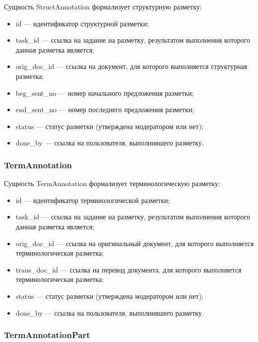 Сущность StructAnnotation формализует структурную разметку:
\begin{itemize}
    \item id --- идентификатор структурной разметки;
    \item task\_id --- ссылка на задание на разметку, результатом выполнения которого данная разметка является;
    \item orig\_doc\_id --- ссылка на документ, для которого выполняется структурная разметка;
    \item beg\_sent\_no --- номер начального предложения разметки;
    \item end\_sent\_no --- номер последнего предложения разметки;
    \item status --- статус разметки (утверждена модератором или нет);
    \item done\_by --- ссылка на пользователя, выполнившего разметку.
\end{itemize}

\subsubsection*{TermAnnotation}

Сущность TermAnnotation формализует терминологическую разметку:
\begin{itemize}
    \item id --- идентификатор терминологической разметки;
    \item task\_id --- ссылка на задание на разметку, результатом выполнения которого данная разметка является;
    \item orig\_doc\_id --- ссылка на оригинальный документ, для которого выполняется терминологическая разметка;
    \item trans\_doc\_id --- ссылка на перевод документа, для которого выполняется терминологическая разметка;
    \item status --- статус разметки (утверждена модератором или нет);
    \item done\_by --- ссылка на пользователя, выполнившего разметку.
\end{itemize}

\subsubsection*{TermAnnotationPart}

